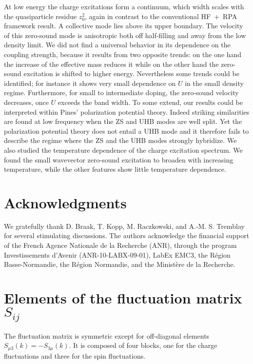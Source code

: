 \documentclass[showpacs,amsmath,twocolumn,floatfix]{revtex4-1}
\begin{document}
At low energy the charge excitations form a continuum, which width
scales with the quasiparticle residue $z_0^2$, again in contrast to the
conventional HF~+~RPA framework result. A collective mode lies above its
upper boundary. The velocity of this zero-sound mode is anisotropic both
off half-filling and away from the low density limit. We did not find a
universal behavior in its dependence on the coupling strength, because
it results from two opposite trends: on the one hand the increase of the
effective mass reduces it while on the other hand the zero-sound
excitation is shifted to higher energy. Nevertheless some trends could
be identified; for instance it shows very small dependence on $U$ in the
small density regime. Furthermore, for small to intermediate doping, the
zero-sound velocity decreases, once $U$ exceeds the band width. To some
extend, our results could be interpreted within Pines' polarization potential 
theory. Indeed striking similarities are found at low frequency when the ZS 
and UHB modes are well split. Yet the polarization potential theory does not 
entail a UHB mode and it therefore fails to describe the regime where the ZS 
and the UHB modes strongly hybridize. We also studied the temperature dependence of the 
charge excitation spectrum. We found the small wavevector zero-sound 
excitation to broaden with increasing temperature, while the other features 
show little temperature dependence. 

\section*{Acknowledgments}

We gratefully thank D. Braak, T. Kopp, M. Raczkowski, and A.-M. S. Tremblay 
for several stimulating discussions. The authors acknowledge the financial 
support of the French Agence Nationale de la Recherche (ANR), through
the program Investissements d'Avenir (ANR-10-LABX-09-01), LabEx EMC3, the
R\'egion Basse-Normandie, the R\'egion Normandie, and the Minist\`ere de la
Recherche.

\appendix

\section{Elements of the fluctuation matrix $S_{ij}$}
\label{app_S}

The fluctuation matrix is symmetric except for off-diagonal elements 
$S_{\mu3}(k) = - S_{3\mu}(k)$. It is composed of four blocks, one for the charge 
fluctuations and three for the spin fluctuations. 
\end{document}
